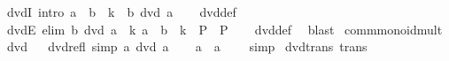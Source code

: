 \begin{isabellebody}
\isanewline
{}\isamarkupfalse%
\ dvdI\ {\isacharbrackleft}{\kern0pt}intro{\isacharquery}{\kern0pt}{\isacharbrackright}{\kern0pt}{\isacharcolon}{\kern0pt}\ {\isachardoublequoteopen}a\ {\isacharequal}{\kern0pt}\ b\ {\isacharasterisk}{\kern0pt}\ k\ {\isasymLongrightarrow}\ b\ dvd\ a{\isachardoublequoteclose}\isanewline
%
\isadelimproof
\ \ %
\endisadelimproof
%
\isatagproof
{}\isamarkupfalse%
\ dvd{\isacharunderscore}{\kern0pt}def\ \isacommand{{\isachardot}{\kern0pt}{\isachardot}{\kern0pt}}\isamarkupfalse%
%
\endisatagproof
{\isafoldproof}%
%
\isadelimproof
\isanewline
%
\endisadelimproof
\isanewline
{}\isamarkupfalse%
\ dvdE\ {\isacharbrackleft}{\kern0pt}elim{\isacharbrackright}{\kern0pt}{\isacharcolon}{\kern0pt}\ {\isachardoublequoteopen}b\ dvd\ a\ {\isasymLongrightarrow}\ {\isacharparenleft}{\kern0pt}{\isasymAnd}k{\isachardot}{\kern0pt}\ a\ {\isacharequal}{\kern0pt}\ b\ {\isacharasterisk}{\kern0pt}\ k\ {\isasymLongrightarrow}\ P{\isacharparenright}{\kern0pt}\ {\isasymLongrightarrow}\ P{\isachardoublequoteclose}\isanewline
%
\isadelimproof
\ \ %
\endisadelimproof
%
\isatagproof
{}\isamarkupfalse%
\ dvd{\isacharunderscore}{\kern0pt}def\ \isamarkupfalse%
\ blast%
\endisatagproof
{\isafoldproof}%
%
\isadelimproof
\isanewline
%
\endisadelimproof
\isanewline
{}\isamarkupfalse%
\isanewline
\isanewline
{}\isamarkupfalse%
\ comm{\isacharunderscore}{\kern0pt}monoid{\isacharunderscore}{\kern0pt}mult\isanewline
{}\isanewline
\isanewline
{}\isamarkupfalse%
\ dvd%
\isadelimproof
\ %
\endisadelimproof
%
\isatagproof
\isacommand{{\isachardot}{\kern0pt}}\isamarkupfalse%
%
\endisatagproof
{\isafoldproof}%
%
\isadelimproof
%
\endisadelimproof
\isanewline
\isanewline
{}\isamarkupfalse%
\ dvd{\isacharunderscore}{\kern0pt}refl\ {\isacharbrackleft}{\kern0pt}simp{\isacharbrackright}{\kern0pt}{\isacharcolon}{\kern0pt}\ {\isachardoublequoteopen}a\ dvd\ a{\isachardoublequoteclose}\isanewline
%
\isadelimproof
%
\endisadelimproof
%
\isatagproof
{}\isamarkupfalse%
\isanewline
\ \ \isamarkupfalse%
\ {\isachardoublequoteopen}a\ {\isacharequal}{\kern0pt}\ a\ {\isacharasterisk}{\kern0pt}\ {}{\isachardoublequoteclose}\ \isamarkupfalse%
\ simp\isanewline
{}\isamarkupfalse%
%
\endisatagproof
{\isafoldproof}%
%
\isadelimproof
\isanewline
%
\endisadelimproof
\isanewline
{}\isamarkupfalse%
\ dvd{\isacharunderscore}{\kern0pt}trans\ {\isacharbrackleft}{\kern0pt}trans{\isacharbrackright}{\kern0pt}{\isacharcolon}{\kern0pt}\isanewline

\end{isabellebody}
